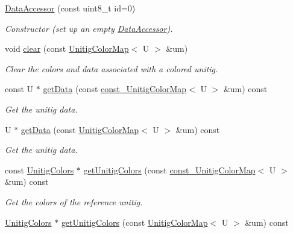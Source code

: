 \begin{DoxyCompactItemize}
\item 
\mbox{\label{classDataAccessor_a0c30e8dfb40ff350083dd0822082dd66}} 
\hyperlink{classDataAccessor_a0c30e8dfb40ff350083dd0822082dd66}{Data\+Accessor} (const uint8\+\_\+t id=0)
\begin{DoxyCompactList}\small\item\em Constructor (set up an empty \hyperlink{classDataAccessor}{Data\+Accessor}). \end{DoxyCompactList}\item 
void \hyperlink{classDataAccessor_a8a0c9cd4d31f8c7b08dcb06e420ad202}{clear} (const \hyperlink{classUnitigMap}{Unitig\+Color\+Map}$<$ U $>$ \&um)
\begin{DoxyCompactList}\small\item\em Clear the colors and data associated with a colored unitig. \end{DoxyCompactList}\item 
const U $\ast$ \hyperlink{classDataAccessor_af72510548faff435e7241d4dacd63549}{get\+Data} (const \hyperlink{classUnitigMap}{const\+\_\+\+Unitig\+Color\+Map}$<$ U $>$ \&um) const
\begin{DoxyCompactList}\small\item\em Get the unitig data. \end{DoxyCompactList}\item 
U $\ast$ \hyperlink{classDataAccessor_ab7993cfaba89b72b52acfebf5c6133ea}{get\+Data} (const \hyperlink{classUnitigMap}{Unitig\+Color\+Map}$<$ U $>$ \&um) const
\begin{DoxyCompactList}\small\item\em Get the unitig data. \end{DoxyCompactList}\item 
const \hyperlink{classUnitigColors}{Unitig\+Colors} $\ast$ \hyperlink{classDataAccessor_a8aec5f2dc2b59701c7e0ee29f7c320e5}{get\+Unitig\+Colors} (const \hyperlink{classUnitigMap}{const\+\_\+\+Unitig\+Color\+Map}$<$ U $>$ \&um) const
\begin{DoxyCompactList}\small\item\em Get the colors of the reference unitig. \end{DoxyCompactList}\item 
\hyperlink{classUnitigColors}{Unitig\+Colors} $\ast$ \hyperlink{classDataAccessor_a1bfa8894d99ff518a628d4985f9598ae}{get\+Unitig\+Colors} (const \hyperlink{classUnitigMap}{Unitig\+Color\+Map}$<$ U $>$ \&um) const

\end{DoxyCompactItemize}
